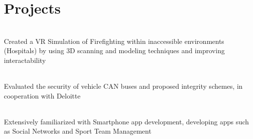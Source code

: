 \documentclass[]{deedy-resume-openfont}
\begin{document}
\section{Projects}
\raggedright


\\
Created a VR Simulation of Firefighting within inaccessible environments (Hospitals) by using 3D scanning and modeling techniques and improving interactability\\
\sectionsep
  

\\
Evaluated the security of vehicle CAN buses and proposed integrity schemes, in cooperation with Deloitte\\
\sectionsep
  

\\
Extensively familiarized with Smartphone app development, developing apps such as Social Networks and Sport Team Management\\
\sectionsep
\end{document}
